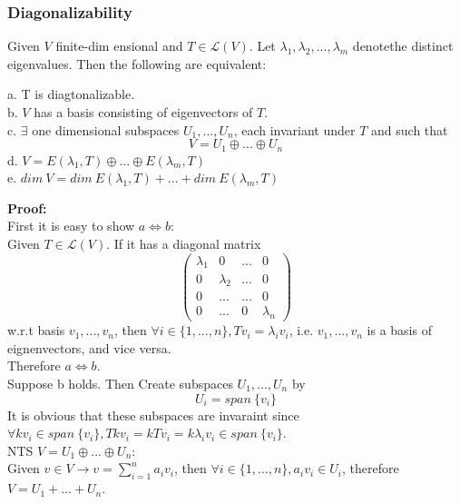 \documentclass{article}
\begin{document}
\subsubsection{Diagonalizability}
Given $V$ finite-dim ensional and $T \in \mathcal{L}(V)$. Let $\lambda_1, \lambda_2, ..., \lambda_m$ denotethe distinct eigenvalues. Then the following are equivalent:
\begin{addmargin}[1em]{0em}
    a. T is diagtonalizable.\\
    b. $V$ has a basis consisting of eigenvectors of $T$.\\
    c. $\exists$ one dimensional subspaces $U_1, ..., U_n$, each invariant under $T$ and such that
    \begin{equation*}
        V = U_1 \oplus ... \oplus U_n
    \end{equation*}
    d. $V = E(\lambda_1, T) \oplus ... \oplus E(\lambda_m, T)$\\
    e. $dim\ V = dim\ E(\lambda_1, T) + ... + dim\ E(\lambda_m, T)$
\end{addmargin}
\textbf{Proof:}\\
First it is easy to show $a \iff b$:\\
Given $T \in \mathcal{L}(V)$. If it has a diagonal matrix\\
\begin{equation*}
    \begin{pmatrix}
        \lambda_1 & 0 & ... & 0\\
        0 & \lambda_2 & ... & 0\\
        0 & ... & ... & 0\\
        0 & ... & 0 & \lambda_n
    \end{pmatrix}
\end{equation*}
w.r.t basis $v_1, ..., v_n$, then $\forall i \in \{1, ..., n\},Tv_i = \lambda_i v_i$, i.e. $v_1, ..., v_n$ is a basis of eignenvectors, and vice versa.\\
Therefore $a \iff b$.\\
Suppose b holds. Then Create subspaces $U_1, ..., U_n$ by
\begin{equation*}
    U_i = span\ \{v_i\}
\end{equation*}
It is obvious that these subspaces are invaraint since $\forall kv_i \in span\ \{v_i\}, Tkv_i = kTv_i = k\lambda_iv_i \in span\ \{v_i\}$.\\
NTS $V = U_1 \oplus ... \oplus U_n$:\\
Given $v \in V \rightarrow v = \sum_{i=1}^{n} a_iv_i$, then $\forall i \in \{1, ..., n\}, a_iv_i \in U_i$, therefore $V = U_1 + ... + U_n$.\\
\end{document}
